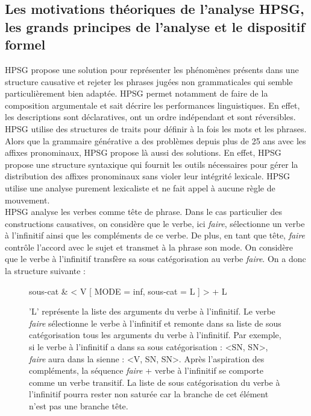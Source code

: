 \newpage

\subsection{Les motivations théoriques de l'analyse HPSG, les grands principes de l'analyse et le dispositif formel}

	HPSG propose une solution pour représenter les phénomènes présents dans une structure causative et rejeter les
	phrases jugées non grammaticales qui semble particulièrement bien adaptée. HPSG permet notamment de faire de la composition
	argumentale et sait décrire les performances linguistiques. En effet, les descriptions sont déclaratives, ont un ordre
	indépendant  et sont réversibles. HPSG utilise des structures de traits pour définir à la fois les mots et les phrases.
	Alors que la grammaire générative a des problèmes depuis plus de 25 ans avec les affixes pronominaux, HPSG propose là aussi
	des solutions. En effet, HPSG  propose une structure syntaxique qui fournit les outils nécessaires pour gérer la distribution
	des affixes pronominaux sans violer leur intégrité lexicale. HPSG utilise une analyse purement lexicaliste et ne fait appel
	à aucune règle de mouvement.
	\\
	HPSG  analyse les verbes comme tête de phrase. Dans le cas particulier des constructions causatives, on considère que le
	verbe, ici \emph{faire}, sélectionne un verbe à l'infinitif ainsi que les compléments de ce verbe. De plus, en tant que
	tête, \emph{faire} contrôle l'accord avec le sujet et transmet à la phrase son mode. On considère que le verbe à l'infinitif
	transfère sa sous catégorisation au verbe \emph{faire}. On a donc la structure suivante :

\begin{figure}[ht]
\begin{avm}
			sous-cat  \& < V [ MODE = inf, sous-cat = L ] > + L

\end{avm}
\caption{'L' représente la liste des arguments du verbe à l'infinitif. Le verbe \emph{faire} sélectionne le verbe à l'infinitif
et remonte dans sa liste de sous catégorisation tous les arguments du verbe à l'infinitif. Par exemple, si le verbe à l'infinitif
a dans sa sous catégorisation : <SN, SN>, \emph{faire} aura dans la sienne : <V, SN, SN>. Après l'aspiration des compléments, la
séquence \emph{faire} + verbe à l'infinitif se comporte comme un verbe transitif. La liste de sous catégorisation du verbe à
l'infinitif pourra rester non saturée car la branche de cet élément n'est pas une branche tête.}
\end{figure}

